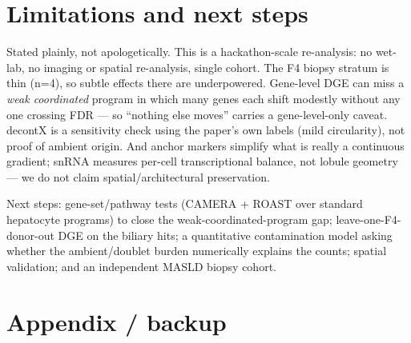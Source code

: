 \documentclass[11pt,a4paper]{article}
\begin{document}
\section{Limitations and next steps}

Stated plainly, not apologetically. This is a hackathon-scale re-analysis: no wet-lab, no imaging or spatial re-analysis, single cohort. The F4 biopsy stratum is thin (n=4), so subtle effects there are underpowered. Gene-level DGE can miss a \emph{weak coordinated} program in which many genes each shift modestly without any one crossing FDR --- so ``nothing else moves'' carries a gene-level-only caveat. decontX is a sensitivity check using the paper's own labels (mild circularity), not proof of ambient origin. And anchor markers simplify what is really a continuous gradient; snRNA measures per-cell transcriptional balance, not lobule geometry --- we do not claim spatial/architectural preservation.

Next steps: gene-set/pathway tests (CAMERA + ROAST over standard hepatocyte programs) to close the weak-coordinated-program gap; leave-one-F4-donor-out DGE on the biliary hits; a quantitative contamination model asking whether the ambient/doublet burden numerically explains the counts; spatial validation; and an independent MASLD biopsy cohort.

\section*{Appendix / backup}
\end{document}
